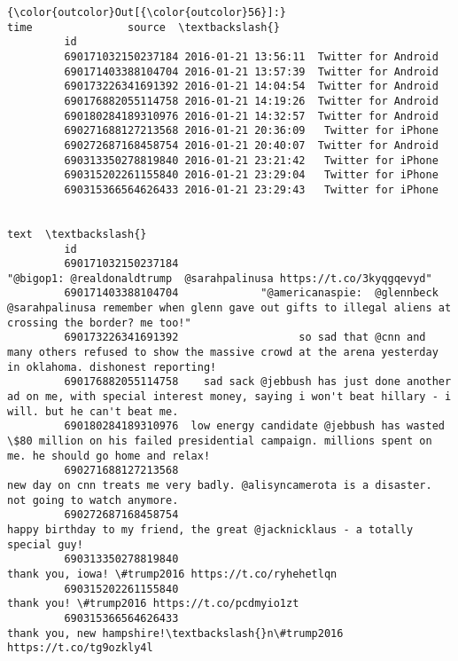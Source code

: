 \documentclass[11pt]{article}
\begin{document}
\begin{Verbatim}[commandchars=\\\{\}]
{\color{outcolor}Out[{\color{outcolor}56}]:}                                   time               source  \textbackslash{}
         id                                                            
         690171032150237184 2016-01-21 13:56:11  Twitter for Android   
         690171403388104704 2016-01-21 13:57:39  Twitter for Android   
         690173226341691392 2016-01-21 14:04:54  Twitter for Android   
         690176882055114758 2016-01-21 14:19:26  Twitter for Android   
         690180284189310976 2016-01-21 14:32:57  Twitter for Android   
         690271688127213568 2016-01-21 20:36:09   Twitter for iPhone   
         690272687168458754 2016-01-21 20:40:07  Twitter for Android   
         690313350278819840 2016-01-21 23:21:42   Twitter for iPhone   
         690315202261155840 2016-01-21 23:29:04   Twitter for iPhone   
         690315366564626433 2016-01-21 23:29:43   Twitter for iPhone   
         
                                                                                                                                                                     text  \textbackslash{}
         id                                                                                                                                                                 
         690171032150237184                                                                           "@bigop1: @realdonaldtrump  @sarahpalinusa https://t.co/3kyqgqevyd"   
         690171403388104704             "@americanaspie:  @glennbeck @sarahpalinusa remember when glenn gave out gifts to illegal aliens at crossing the border? me too!"   
         690173226341691392                   so sad that @cnn and many others refused to show the massive crowd at the arena yesterday in oklahoma. dishonest reporting!   
         690176882055114758    sad sack @jebbush has just done another ad on me, with special interest money, saying i won't beat hillary - i will. but he can't beat me.   
         690180284189310976  low energy candidate @jebbush has wasted \$80 million on his failed presidential campaign. millions spent on me. he should go home and relax!   
         690271688127213568                                               new day on cnn treats me very badly. @alisyncamerota is a disaster. not going to watch anymore.   
         690272687168458754                                                                 happy birthday to my friend, the great @jacknicklaus - a totally special guy!   
         690313350278819840                                                                                           thank you, iowa! \#trump2016 https://t.co/ryhehetlqn   
         690315202261155840                                                                                                 thank you! \#trump2016 https://t.co/pcdmyio1zt   
         690315366564626433                                                                                 thank you, new hampshire!\textbackslash{}n\#trump2016 https://t.co/tg9ozkly4l   
         

\end{Verbatim}
\end{document}
